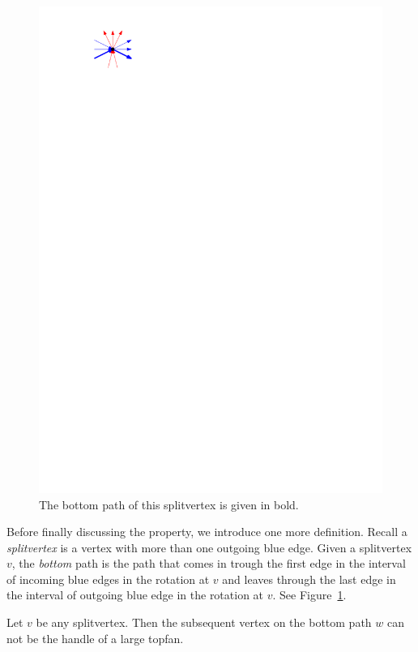     \begin{figure}
      \centering
      \includegraphics[scale=.9]{unifiedAlgo/img/sweep/bottompath.pdf}
      \caption{The bottom path of this splitvertex is given in bold.}
      \label{fig:sweep:bottomPath}
    \end{figure}

    Before finally discussing the property, we introduce one more definition.
    Recall a \emph{splitvertex} is a vertex with more than one outgoing blue edge.
    Given a splitvertex $v$, the \emph{bottom} path is the path that comes in trough the first edge in the interval of incoming blue edges in the rotation at $v$ and leaves through the last edge in the interval of outgoing blue edge in the rotation at $v$.
    See Figure~\ref{fig:sweep:bottomPath}.

    \begin{lemma}
      \label{lm:sweep:NoTwoSplitsAboveEachOther}
      Let $v$ be any splitvertex. Then the subsequent vertex on the bottom path $w$ can not be the handle of a large topfan.
    \end{lemma}


